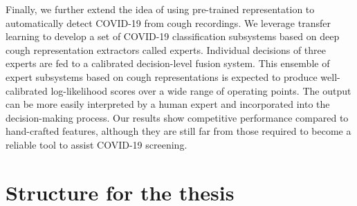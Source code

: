 Finally, we further extend the idea of using pre-trained representation to automatically detect COVID-19 from cough recordings. We leverage transfer learning to develop a set of COVID-19 classification subsystems based on deep cough representation extractors called experts. Individual decisions of three experts are fed to a calibrated decision-level fusion system. This ensemble of expert subsystems based on cough representations is expected to produce well-calibrated log-likelihood scores over a wide range of operating points. The output can be more easily interpreted by a human expert and incorporated into the decision-making process. Our results show competitive performance compared to hand-crafted features, although they are still far from those required to become a reliable tool to assist COVID-19 screening.


\section{Structure for the thesis}

